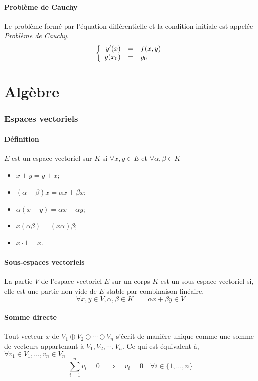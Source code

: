 \subsection{Problème de Cauchy}
Le problème formé par l'équation différentielle et
la condition initiale est appelée \emph{Problème de Cauchy}.
\[
\left\{
  \begin{array}{r c l}
    y'(x) &=& f(x,y)\\
    y(x_0) &=& y_0
  \end{array}
\right.
 \]

\part{Algèbre}
\section{Espaces vectoriels}
\subsection{Définition}
$E$ est un espace vectoriel sur $K$ si
$\forall x,y \in E$ et $\forall \alpha,\beta \in K$
\begin{itemize}
  \item $x + y = y + x$;
  \item $(\alpha + \beta)x = \alpha{x} + \beta{x}$;
  \item $\alpha{(x + y)} = \alpha{x} + \alpha{y}$;
  \item $x(\alpha{\beta}) = (x\alpha{})\beta{}$;
  \item $x\cdot1 = x$.
\end{itemize}

\subsection{Sous-espaces vectoriels}
La partie $V$ de l'espace vectoriel $E$ sur un corps $K$ est
un sous espace vectoriel si,
elle est une partie non vide de $E$ stable par combinaison linéaire.
\[ \forall{x, y} \in V, \alpha, \beta \in K \qquad \alpha x + \beta y \in V \]

\subsection{Somme directe}
Tout vecteur $x$ de $V_1 \oplus V_2 \oplus \cdots \oplus V_n$ s'écrit de manière
unique comme une somme de vecteurs appartenant à $V_1, V_2, \cdots , V_n$.
Ce qui est équivalent à, $\forall v_1 \in V_1, \ldots, v_n \in V_n$
\[ \sum_{i = 1}^{n} v_i = 0\quad\Rightarrow\quad v_i =
0\quad\forall i\in\{1, \ldots, n\} \]

